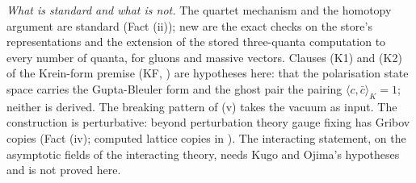 \emph{What is standard and what is not.} The quartet mechanism and the homotopy argument are standard (Fact (ii)); new are the exact checks on the store's representations and the extension of the stored three-quanta computation to every number of quanta, for gluons and massive vectors. Clauses (K1) and (K2) of the Krein-form premise (KF, ) are hypotheses here: that the polarisation state space carries the Gupta-Bleuler form and the ghost pair the pairing $\langle c, \bar c\rangle_K = 1$; neither is derived. The breaking pattern of (v) takes the vacuum as input. The construction is perturbative: beyond perturbation theory gauge fixing has Gribov copies (Fact (iv); computed lattice copies in ). The interacting statement, on the asymptotic fields of the interacting theory, needs Kugo and Ojima's hypotheses and is not proved here.
